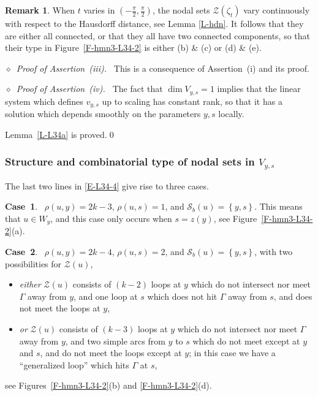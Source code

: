 \documentclass[12pt,a4paper]{amsart}
\theoremstyle{plain} %
\theoremstyle{definition}
\newtheorem{remark}[theorem]{Remark}
\numberwithin{equation}{section}
\numberwithin{figure}{section}
\numberwithin{table}{section}
\newcommand{\cS}{\mathcal{S}}
\newcommand{\cZ}{\mathcal{Z}}
\newcommand{\set}[1]{\left\lbrace #1 \right\rbrace}
\newcommand{\pib}{\frac{\pi}{2}}
\newcommand{\noi}{\noindent}
\newcommand{\noid}{\noindent $\diamond$~}
\begin{document}
\begin{remark}\label{R-hmn3-L34-4}
When $t$ varies in $(-\pib,\pib)$, the nodal sets $\cZ(\zeta_{t})$
vary continuously with respect to the Hausdorff distance, see Lemma \ref{L-hdn}.
It follows that they are either all connected, or that they all have two connected components, so that their type in Figure~\ref{F-hmn3-L34-2} is either (b) \& (c)
or (d) \& (e).
\end{remark}%

\noid \emph{Proof of Assertion~(iii).~} This is a consequence of  Assertion~(i) and its proof.\medskip

\noid \emph{Proof of Assertion~(iv).~} The fact that $\dim V_{y,s} = 1$ implies that the linear system which defines $v_{y,s}$ up to scaling has constant rank, so that it has a solution which depends smoothly on the parameters $y, s$ locally. \medskip

Lemma~\ref{L-L34a} is proved.\hfill \qed


\subsubsection{Structure and combinatorial type of nodal sets in $V_{y,s}$}\label{SSS-hmn32bas}

The last two lines in \eqref{E-L34-4} give rise to three cases.\smallskip

\noi \textbf{Case~1}.~ $\rho(u,y) = 2k-3$, $\rho(u,s) = 1$,  and $\cS_b(u) = \set{y,s}$.  This means that $u \in W_y$, and this case only occurs when $s = z(y)$, see Figure~\ref{F-hmn3-L34-2}(a).\smallskip

\noi \textbf{Case~2}.~ $\rho(u,y) = 2k-4$, $\rho(u,s) = 2$, and $\cS_b(u) = \set{y,s}$, with two possibilities for $\cZ(u)$,
\begin{itemize}
  \item[$\diamond$] \emph{either} $\cZ(u)$ consists of $(k-2)$ loops at $y$ which do not intersect nor meet $\Gamma $ away from $y$, and one loop at $s$ which does not hit $\Gamma $ away from $s$, and does not meet the loops at $y$,
  \item[$\diamond$] \emph{or} $\cZ(u)$ consists of $(k-3)$ loops at $y$  which do not intersect nor meet $\Gamma $ away from $y$, and two simple arcs from $y$ to $s$ which do not meet except at $y$ and $s$, and do not meet the loops except at $y$; in this case we have a ``generalized loop'' which hits $\Gamma $ at $s$,
\end{itemize}
see Figures~\ref{F-hmn3-L34-2}(b) and \ref{F-hmn3-L34-2}(d).\smallskip
\end{document}
